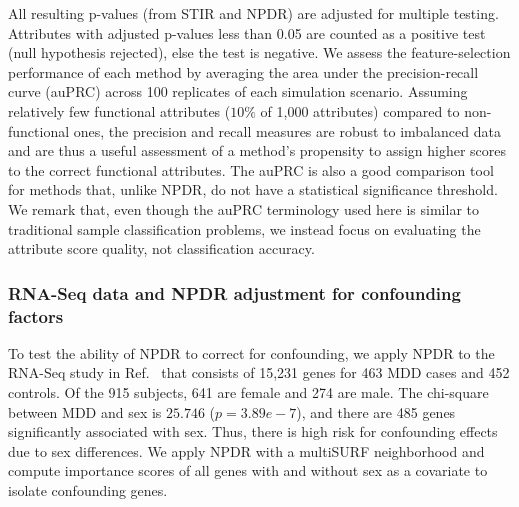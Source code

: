 \documentclass[10pt]{article}
\begin{document}
All resulting p-values (from STIR and NPDR) are adjusted for multiple testing.
Attributes with adjusted p-values less than 0.05 are counted as a positive test (null hypothesis rejected), else the test is negative.
We assess the feature-selection performance of each method by averaging the area under the precision-recall curve (auPRC) across 100 replicates of each simulation scenario.
Assuming relatively few functional attributes ($10\%$ of 1,000 attributes) compared to non-functional ones, the precision and recall measures are robust to imbalanced data and are thus a useful assessment of a method's propensity to assign higher scores to the correct functional attributes.
The auPRC is also a good comparison tool for methods that, unlike NPDR, do not have a statistical significance threshold.
We remark that, even though the auPRC terminology used here is similar to traditional sample classification problems, we instead focus on evaluating the attribute score quality, not classification accuracy.

\subsubsection{RNA-Seq data and NPDR adjustment for confounding factors}
To test the ability of NPDR to correct for confounding, we apply NPDR to the RNA-Seq study in Ref.~\cite{mostafavi14} that consists of 15,231 genes for 463 MDD cases and 452 controls.
Of the 915 subjects, 641 are female and 274 are male.
The chi-square between MDD and sex is $25.746$ ($p=3.89e-7$), and there are 485 genes significantly associated with sex.
Thus, there is high risk for confounding effects due to sex differences.
We apply NPDR with a multiSURF neighborhood and compute importance scores of all genes with and without sex as a covariate to isolate confounding genes.
\end{document}

